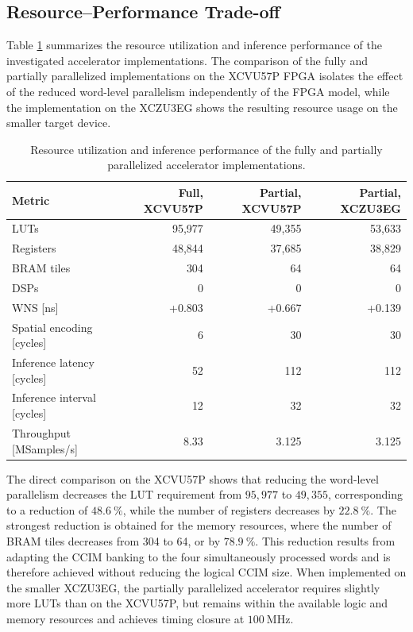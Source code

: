 \subsection{Resource--Performance Trade-off}
\label{sec:FPGAResultsMetrics}

Table \ref{tab:fpga_comparison} summarizes the resource utilization and inference performance of the investigated accelerator implementations. The comparison of the fully and partially parallelized implementations on the XCVU57P FPGA isolates the effect of the reduced word-level parallelism independently of the FPGA model, while the implementation on the XCZU3EG shows the resulting resource usage on the smaller target device.

\begin{table}[ht]
    \centering
    \caption{Resource utilization and inference performance of the fully and partially parallelized accelerator implementations.}
    \label{tab:fpga_comparison}
    \begin{tabular}{lrrr}
        \hline
        Metric & Full, XCVU57P & Partial, XCVU57P & Partial, XCZU3EG \\
        \hline
        LUTs & 95,977 & 49,355 & 53,633 \\
        Registers & 48,844 & 37,685 & 38,829 \\
        BRAM tiles & 304 & 64 & 64 \\
        DSPs & 0 & 0 & 0 \\
        WNS [ns] & +0.803 & +0.667 & +0.139 \\
        Spatial encoding [cycles] & 6 & 30 & 30 \\
        Inference latency [cycles] & 52 & 112 & 112 \\
        Inference interval [cycles] & 12 & 32 & 32 \\
        Throughput [MSamples/s] & 8.33 & 3.125 & 3.125 \\
        \hline
    \end{tabular}
\end{table}

The direct comparison on the XCVU57P shows that reducing the word-level parallelism decreases the LUT requirement from $95{,}977$ to $49{,}355$, corresponding to a reduction of $48.6~\%$, while the number of registers decreases by $22.8~\%$. The strongest reduction is obtained for the memory resources, where the number of BRAM tiles decreases from 304 to 64, or by $78.9~\%$. This reduction results from adapting the CCIM banking to the four simultaneously processed words and is therefore achieved without reducing the logical CCIM size. When implemented on the smaller XCZU3EG, the partially parallelized accelerator requires slightly more LUTs than on the XCVU57P, but remains within the available logic and memory resources and achieves timing closure at $100~\mathrm{MHz}$.

